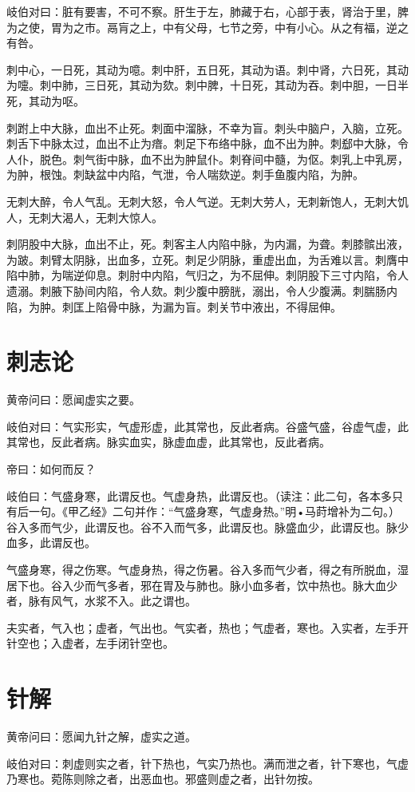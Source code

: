 \documentclass{article}%
\begin{document}
岐伯对曰：脏有要害，不可不察。肝生于左，肺藏于右，心部于表，肾治于里，脾为之使，胃为之市。鬲肓之上，中有父母，七节之旁，中有小心。从之有福，逆之有咎。

刺中心，一日死，其动为噫。刺中肝，五日死，其动为语。刺中肾，六日死，其动为嚏。刺中肺，三日死，其动为欬。刺中脾，十日死，其动为吞。刺中胆，一日半死，其动为呕。

刺跗上中大脉，血出不止死。刺面中溜脉，不幸为盲。刺头中脑户，入脑，立死。刺舌下中脉太过，血出不止为瘖。刺足下布络中脉，血不出为肿。刺郄中大脉，令人仆，脱色。刺气街中脉，血不出为肿鼠仆。刺脊间中髓，为伛。刺乳上中乳房，为肿，根蚀。刺缺盆中内陷，气泄，令人喘欬逆。刺手鱼腹内陷，为肿。

无刺大醉，令人气乱。无刺大怒，令人气逆。无刺大劳人，无刺新饱人，无刺大饥人，无刺大渴人，无刺大惊人。

刺阴股中大脉，血出不止，死。刺客主人内陷中脉，为内漏，为聋。刺膝髌出液，为跛。刺臂太阴脉，出血多，立死。刺足少阴脉，重虚出血，为舌难以言。刺膺中陷中肺，为喘逆仰息。刺肘中内陷，气归之，为不屈伸。刺阴股下三寸内陷，令人遗溺。刺腋下胁间内陷，令人欬。刺少腹中膀胱，溺出，令人少腹满。刺腨肠内陷，为肿。刺匡上陷骨中脉，为漏为盲。刺关节中液出，不得屈伸。
\section{刺志论}
黄帝问曰：愿闻虚实之要。

岐伯对曰：气实形实，气虚形虚，此其常也，反此者病。谷盛气盛，谷虚气虚，此其常也，反此者病。脉实血实，脉虚血虚，此其常也，反此者病。

帝曰：如何而反？

岐伯曰：气盛身寒，此谓反也。气虚身热，此谓反也。（读注：此二句，各本多只有后一句。《甲乙经》二句并作：“气盛身寒，气虚身热。”明•马莳增补为二句。）谷入多而气少，此谓反也。谷不入而气多，此谓反也。脉盛血少，此谓反也。脉少血多，此谓反也。

气盛身寒，得之伤寒。气虚身热，得之伤暑。谷入多而气少者，得之有所脱血，湿居下也。谷入少而气多者，邪在胃及与肺也。脉小血多者，饮中热也。脉大血少者，脉有风气，水浆不入。此之谓也。

夫实者，气入也；虚者，气出也。气实者，热也；气虚者，寒也。入实者，左手开针空也；入虚者，左手闭针空也。
\section{针解}
黄帝问曰：愿闻九针之解，虚实之道。

岐伯对曰：刺虚则实之者，针下热也，气实乃热也。满而泄之者，针下寒也，气虚乃寒也。菀陈则除之者，出恶血也。邪盛则虚之者，出针勿按。
\end{document}
